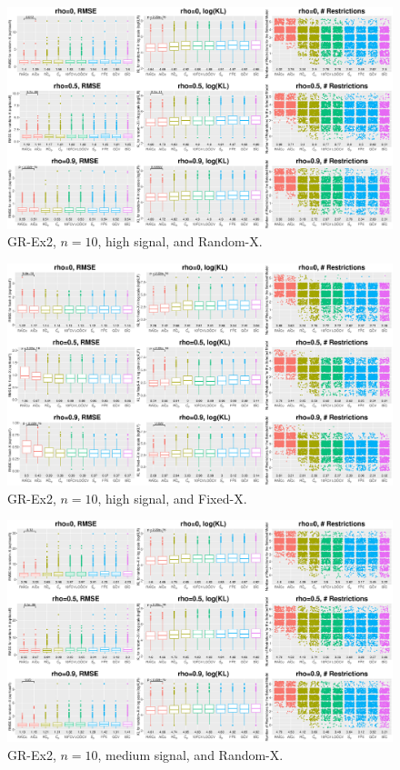 \clearpage
\begin{figure}[!ht]
\centering
\includegraphics[width=\textwidth]{figures/supplement/randomx_GR-Ex2_n10_hsnr.eps}
\caption{GR-Ex2, $n=10$, high signal, and Random-X.}
\end{figure}
\begin{figure}[!ht]
\centering
\includegraphics[width=\textwidth]{figures/supplement/fixedx_GR-Ex2_n10_hsnr.eps}
\caption{GR-Ex2, $n=10$, high signal, and Fixed-X.}
\end{figure}
\clearpage
\begin{figure}[!ht]
\centering
\includegraphics[width=\textwidth]{figures/supplement/randomx_GR-Ex2_n10_msnr.eps}
\caption{GR-Ex2, $n=10$, medium signal, and Random-X.}
\end{figure}
